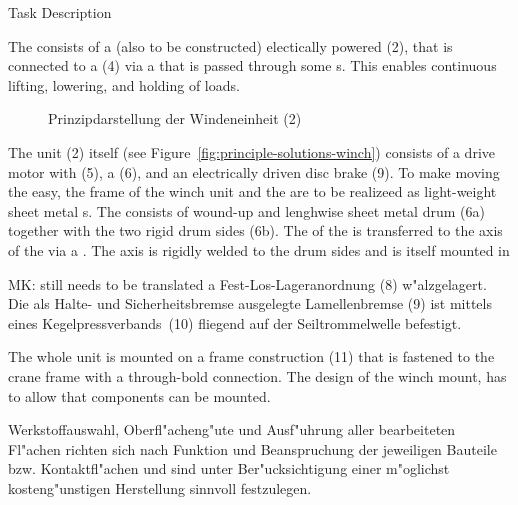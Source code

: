 \documentclass[a4paper]{omdoc}
\begin{document}
\begin{omgroup}{Task Description}
\begin{omtext}
  The  consists of a (also to be constructed) electically powered
   (2), that is connected to a  (4) via a
   that is passed through some s. This enables
  continuous lifting, lowering, and holding of loads.
\end{omtext}

\begin{figure}[ht]
\caption{Prinzipdarstellung der Windeneinheit (2)}\label{fig:principle-solution-winch}
\end{figure}

\begin{omtext}
  The  unit (2) itself (see
  Figure~\ref{fig:principle-solutions-winch}) consists of a drive motor with
   (5), a  (6), and an electrically driven disc
  brake (9). To make moving the  easy, the frame of the
  winch unit and the  are to be realizeed as light-weight sheet metal
  s. The  consists of wound-up and
  lenghwise  sheet metal drum (6a) together with the two rigid drum
  sides (6b). The  of the  is transferred to the
  axis of the  via a . The
  axis is rigidly welded to the drum sides and is itself mounted in
  \begin{oldpart}{MK: still needs to be translated} a Fest-Los-Lageranordnung (8)
    w"alzgelagert. Die als Halte- und Sicherheitsbremse ausgelegte Lamellenbremse (9) ist
    mittels eines Kegelpressverbands (10) fliegend auf der Seiltrommelwelle befestigt.
  \end{oldpart}
\end{omtext}

\begin{omtext}
  The whole  unit is mounted on a frame construction (11) that is
  fastened to the crane frame with a through-bold connection. The design of the winch
  mount, has to allow that components can be mounted.
\end{omtext}

\begin{omtext}
  Werkstoffauswahl, Oberfl"acheng"ute und Ausf"uhrung aller bearbeiteten Fl"achen richten
  sich nach Funktion und Beanspruchung der jeweiligen Bauteile bzw. Kontaktfl"achen und
  sind unter Ber"ucksichtigung einer m"oglichst kosteng"unstigen Herstellung sinnvoll
  festzulegen.
\end{omtext}


\end{omgroup}
\end{document}
